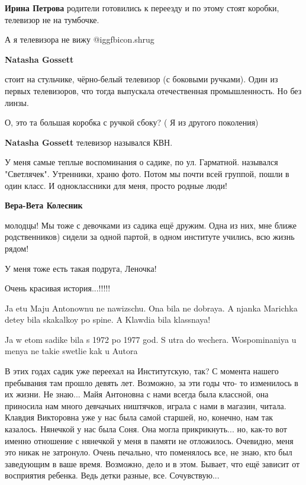 \begin{itemize}
\begin{itemize}
\textbf{Ирина Петрова} родители готовились к переезду и по этому стоят коробки, телевизор не на тумбочке.

А я телевизора не вижу @igg{fbicon.shrug} 

\textbf{Natasha Gossett} 

стоит на стульчике, чёрно-белый телевизор (с боковыми ручками). Один из первых
телевизоров, что тогда выпускала отечественная промышленность. Но без линзы.

О, это та большая коробка с ручкой сбоку?
( Я из другого поколения)

\textbf{Natasha Gossett} телевизор назывался КВН.

\end{itemize} %


У меня самые теплые воспоминания о садике, по ул. Гарматной. назывался
"Светлячек". Утренники, храню фото. Потом мы почти всей группой, пошли в один
класс. И одноклассники для меня, просто родные люди!

\begin{itemize} %
\textbf{Вера-Вета Колесник} 

молодцы! Мы тоже с девочками из садика ещё дружим. Одна из них, мне ближе
родственников) сидели за одной партой, в одном институте учились, всю жизнь
рядом!

У меня тоже есть такая подруга, Леночка!
\end{itemize} %

Очень красивая история...!!!!!

Ja etu Maju Antonownu ne nawizschu. Ona bila ne dobraya. A njanka Marichka detey bila skakalkoy po spine. A Klawdia bila klassnaya!

Ja w etom sadike bila s 1972 po 1977 god. S utra do wechera. Wospominaniya u menya ne takie swetlie kak u Autora


В этих годах садик уже переехал на Институтскую, так? С момента нашего
пребывания там прошло девять лет. Возможно, за эти годы что- то изменилось в их
жизни. Не знаю... Майя Антоновна с нами всегда была классной, она приносила нам
много девчачьих ништячков, играла с нами в магазин, читала. Клавдия Викторовна
уже у нас была самой старшей, но, конечно, нам так казалось. Нянечкой у нас
была Соня. Она могла прикрикнуть... но, как-то вот именно отношение с нянечкой у
меня в памяти не отложилось. Очевидно, меня это никак не затронуло. Очень
печально, что поменялось все, не знаю, кто был заведующим в ваше время.
Возможно, дело и в этом. Бывает, что ещё зависит от восприятия ребенка. Ведь
детки разные, все. Сочувствую...


\end{itemize}
